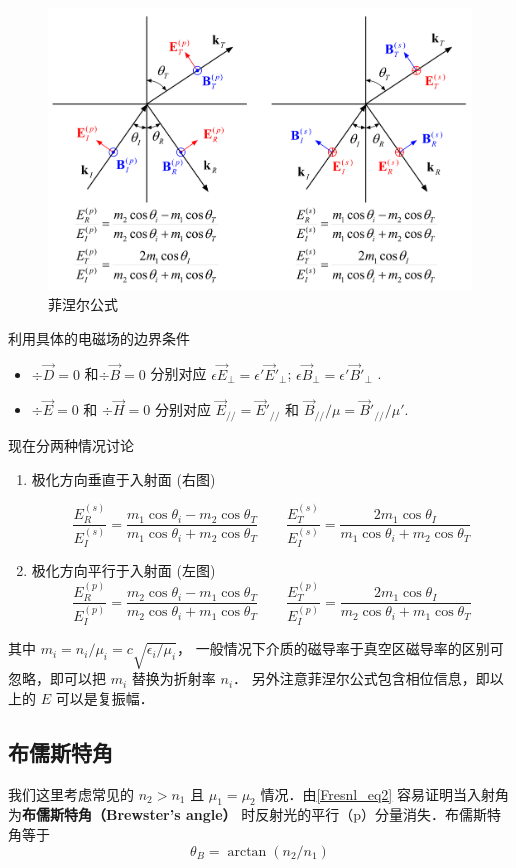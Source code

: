 
\begin{figure}[h]
\centering
\includegraphics[width=14cm]{./figures/Fresnl.pdf}
\caption{菲涅尔公式} \label{Sample_fig1}
\end{figure}
 
利用具体的电磁场的边界条件 %
\begin{itemize}
\item $\div \vec D = 0$ 和$\div \vec B = 0$  分别对应 $\epsilon {\vec E_ \bot } = \epsilon '{\vec E'_ \bot }$; $\epsilon {\vec B_ \bot } = \epsilon '{\vec B'_ \bot }$ .

\item $\div \vec E = 0$ 和 $\div \vec H = 0$ 分别对应 ${\vec E_{//}} = {\vec E'_{//}}$ 和 ${{{{\vec B}_{//}}}}/{\mu } = {{{{\vec B'}_{//}}}}/{{\mu '}}$.
\end{itemize}

现在分两种情况讨论
\begin{enumerate}
\item 极化方向垂直于入射面 (右图)

\begin{equation}
\frac{{E_R^{(s)}}}{{E_I^{(s)}}} =  \frac{{{m_1}\cos {\theta _i} - {m_2}\cos {\theta _T}}}{{{m_1}\cos {\theta _i} + {m_2}\cos {\theta _T}}}
\qquad
\frac{{E_T^{(s)}}}{{E_I^{(s)}}} = \frac{{2{m_1}\cos {\theta _I}}}{{{m_1}\cos {\theta _i} + {m_2}\cos {\theta _T}}}
\end{equation}

\item 极化方向平行于入射面 (左图)
\begin{equation}\label{Fresnl_eq2}
\frac{{E_R^{(p)}}}{{E_I^{(p)}}} =  \frac{{{m_2}\cos {\theta _i} - {m_1}\cos {\theta _T}}}{{{m_2}\cos {\theta _i} + {m_1}\cos {\theta _T}}}
\qquad
\frac{{E_T^{(p)}}}{{E_I^{(p)}}} =  \frac{{2{m_1}\cos {\theta _I}}}{{{m_2}\cos {\theta _i} + {m_1}\cos {\theta _T}}}
\end{equation}
\end{enumerate}
其中 $m_i=n_i/\mu_i = c\sqrt{\epsilon_i/\mu_i}$， 一般情况下介质的磁导率于真空区磁导率的区别可忽略，即可以把 $m_i$ 替换为折射率 $n_i$． 另外注意菲涅尔公式包含相位信息，即以上的 $E$ 可以是复振幅．

\subsection{布儒斯特角}
我们这里考虑常见的 $n_2>n_1$ 且 $\mu_1=\mu_2$ 情况．由\autoref{Fresnl_eq2} 容易证明当入射角为\textbf{布儒斯特角（Brewster's angle）} 时反射光的平行（p）分量消失．布儒斯特角等于
\begin{equation}
{\theta _B} = \arctan ({n_2}/{n_1})
\end{equation}
